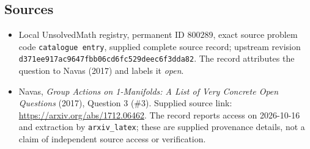 \documentclass[11pt]{article}
\begin{document}
\subsection{Sources}
\begin{itemize}
\item Local UnsolvedMath registry, permanent ID \(800289\), exact source problem code \texttt{catalogue entry}, supplied complete source record; upstream revision \texttt{d371ee917ac9647fbb06cd6fc529deec6f3dda82}. The record attributes the question to Navas (2017) and labels it \emph{open}.
\item Navas, \emph{Group Actions on 1-Manifolds: A List of Very Concrete Open Questions} (2017), Question 3 (\#3). Supplied source link: \url{https://arxiv.org/abs/1712.06462}. The record reports access on 2026-10-16 and extraction by \texttt{arxiv\_latex}; these are supplied provenance details, not a claim of independent source access or verification.
\end{itemize}
\end{document}
